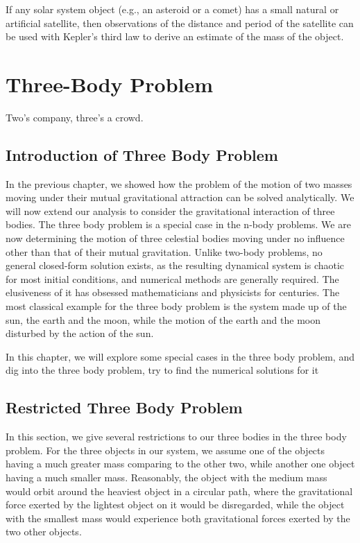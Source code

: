 If any solar system object (e.g., an asteroid or a comet) has a small natural or artificial satellite, then observations of the distance and period of the satellite can be used with Kepler’s third law to derive an estimate of the mass of the object.





\section{Three-Body Problem} 

Two’s company, three’s a crowd.

\subsection{Introduction of Three Body Problem}

In the previous chapter, we showed how the problem of the motion of two masses moving under their mutual gravitational attraction can be solved analytically. We will now extend our analysis to consider the gravitational interaction of three bodies. The three body problem is a special case in the n-body problems. We are now determining the motion of three celestial bodies moving under no influence other than that of their mutual gravitation. Unlike two-body problems, no general closed-form solution exists, as the resulting dynamical system is chaotic for most initial conditions, and numerical methods are generally required. The elusiveness of it has obsessed mathematicians and physicists for centuries. The most classical example for the three body problem is the system made up of the sun, the earth and the moon, while the motion of the earth and the moon disturbed by the action of the sun. 

In this chapter, we will explore some special cases in the three body problem, and dig into the three body problem, try to find the numerical solutions for it


\subsection{Restricted Three Body Problem}

In this section, we give several restrictions to our three bodies in the three body problem. For the three objects in our system, we assume one of the objects having a much greater mass comparing to the other two, while another one object having a much smaller mass. Reasonably, the object with the medium mass would orbit around the heaviest object in a circular path, where the gravitational force exerted by the lightest object on it would be disregarded, while the object with the smallest mass would experience both gravitational forces exerted by the two other objects. 

